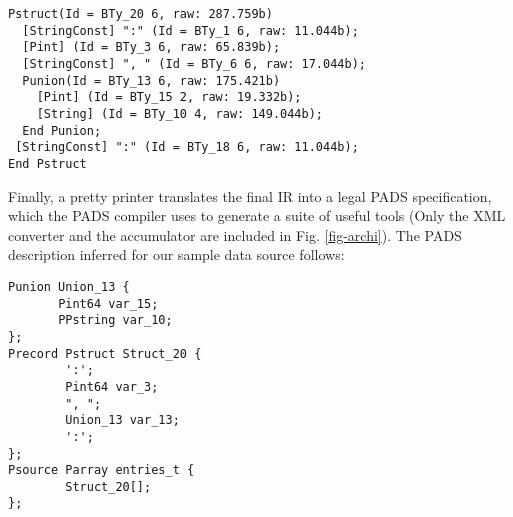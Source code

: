 \documentclass{sig-alt-release2}
\begin{document}
\vspace{3mm}

{\small
\begin{verbatim}
Pstruct(Id = BTy_20 6, raw: 287.759b)
  [StringConst] ":" (Id = BTy_1 6, raw: 11.044b);
  [Pint] (Id = BTy_3 6, raw: 65.839b);
  [StringConst] ", " (Id = BTy_6 6, raw: 17.044b);
  Punion(Id = BTy_13 6, raw: 175.421b)
    [Pint] (Id = BTy_15 2, raw: 19.332b);
    [String] (Id = BTy_10 4, raw: 149.044b);
  End Punion;
 [StringConst] ":" (Id = BTy_18 6, raw: 11.044b);
End Pstruct
\end{verbatim}
}

Finally, a pretty printer translates the final IR into a legal PADS 
specification,  which the PADS compiler uses to generate
a suite of useful tools (Only the XML converter and the accumulator are included
in Fig. \ref{fig-archi}).  The PADS description inferred for our
sample data source follows:

{\small
\begin{verbatim}
Punion Union_13 {
       Pint64 var_15;
       PPstring var_10;
};
Precord Pstruct Struct_20 {
        ':';
        Pint64 var_3;
        ", ";
        Union_13 var_13;
        ':';
};
Psource Parray entries_t {
        Struct_20[];
};
\end{verbatim}
}






\end{document}
